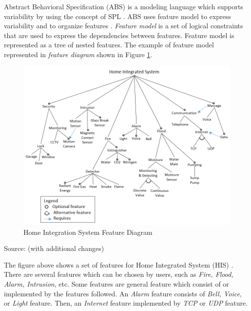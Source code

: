 Abstract Behavioral Specification (ABS) is a modeling language which supports variability by using the concept of SPL \citep{paper.clarke.variability,paper.hanle.ABStutorial,book.abs.abslanguagespecification}. ABS uses feature model to express variability and to organize features \citep{book.abs.abslanguagespecification}. {\it Feature model} is a set of logical constraints that are used to express the dependencies between features. Feature model is represented as a tree of nested features. The example of feature model represented in {\it feature diagram} \citep{paper.kastnerApel.FeatureOrientedSoftwareDevelopment} shown in Figure \ref{fig:FD1}.

\begin{figure}
	\centering
	\includegraphics[width=1\textwidth]
		{pics/hisfd4.png}
	\caption{Home Integration System Feature Diagram}
	\label{fig:FD1}
\end{figure}
\vspace{-1cm}
\begin{center}
	{\small Source: \citep{paper.lee.featurebinding} (with additional changes)}
\end{center}

The figure above shows a set of features for Home Integrated System (HIS) \citep{paper.clarke.variability}. There are several features which can be chosen by users, such as {\it Fire, Flood, Alarm, Intrusion}, etc. Some features are general feature which consist of or implemented by the features followed. An {\it Alarm} feature consists of {\it Bell, Voice}, or {\it Light} feature. Then, an {\it Internet} feature implemented by {\it TCP} or {\it UDP} feature. 

